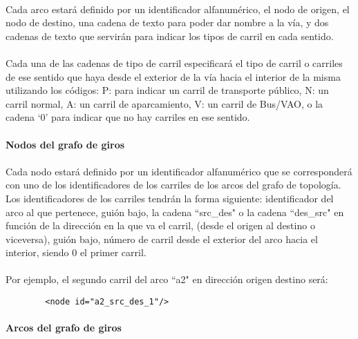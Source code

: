 	\paragraph{}
	Cada arco estará definido por un identificador alfanumérico, el nodo de origen, el nodo de destino, una cadena de texto para poder dar nombre a la vía, y dos cadenas de texto que servirán para indicar los tipos de carril en cada sentido.
	
	\paragraph{}
	Cada una de las cadenas de tipo de carril especificará el tipo de carril o carriles de ese sentido que haya desde el exterior de la vía hacia el interior de la misma utilizando los códigos: P: para indicar un carril de transporte público, N: un carril normal, A: un carril de aparcamiento, V: un carril de Bus/VAO, o la cadena `0' para indicar que no hay carriles en ese sentido.
	
	\paragraph{Nodos del grafo de giros}
	
	\paragraph{}
	Cada nodo estará definido por un identificador alfanumérico que se corresponderá con uno de los identificadores de los carriles de los arcos del grafo de topología. Los identificadores de los carriles tendrán la forma siguiente: identificador del arco al que pertenece, guión bajo, la cadena ``src\_des" o la cadena ``des\_src" en función de la dirección en la que va el carril, (desde el origen al destino o viceversa), guión bajo, número de carril desde el exterior del arco hacia el interior, siendo 0 el primer carril.
	\paragraph{}
	Por ejemplo, el segundo carril del arco ``a2" en dirección origen destino será:
	\begin{lstlisting}
		<node id="a2_src_des_1"/>
	\end{lstlisting}
	
	\paragraph{Arcos del grafo de giros}
	
